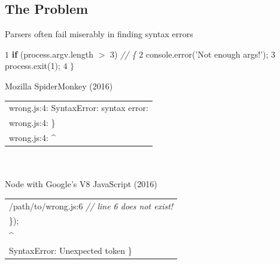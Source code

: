 \documentclass[a0,portrait]{a0poster}
\newcommand\tab[1][1cm]{\hspace*{#1}}
\begin{document}
\vspace{1cm} %


\begin{multicols}{2} %


\color{Navy} %

\section*{The Problem}

\huge Parsers often fail miserably in finding syntax errors

\LARGE
\color{Black}
\begin{algorithmic}
\State $1$ \textbf{if} (process.argv.length $>$ 3) \tab \textit{\color{red} // \{ }\color{Black}
\State $2$ \tab\tab console.error(\color{NavyBlue}'Not enough args!'\color{Black});
\State $3$ \tab\tab process.exit(1);
\State $4$ $\}$
\end{algorithmic}
\color{NavyBlue}Mozilla SpiderMonkey (2016)\\\color{Black}
\begin{tabular}{|p{37cm}}
\tab wrong.js:4: SyntaxError: syntax error:\\
\tab wrong.js:4: \}\\
\tab wrong.js:4: \^{}
\end{tabular}
\\\\
\color{NavyBlue}Node with Google’s V8 JavaScript (2016)\\\color{Black}
\begin{tabular}{|p{37cm}}
\tab /path/to/wrong.js:6 \tab \textit{\color{red} // line 6 does not exist!\color{Black}}\\
\tab \});\\
\tab \^{}\\
\tab SyntaxError: Unexpected token \}
\end{tabular}
\huge
\color{Navy}

\end{multicols}
\end{document}
